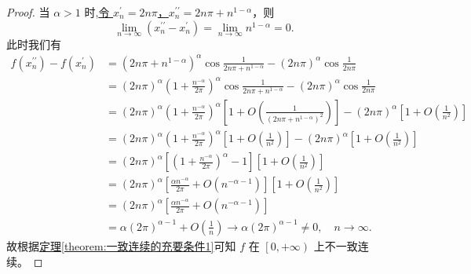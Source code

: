 \documentclass[lang=cn,newtx,10pt,scheme=chinese]{elegantbook}
\begin{document}
\begin{proof}
当 $\alpha > 1$ 时,\hyperlink{找两个数列的方式123}{令 $x_{n}^{\prime} = 2n\pi$，$x_{n}^{\prime\prime} = 2n\pi + n^{1 - \alpha}$}，则
\[
\lim_{n \rightarrow \infty} \left( x_{n}^{\prime\prime} - x_{n}^{\prime} \right) = \lim_{n \rightarrow \infty} n^{1 - \alpha} = 0.
\]
此时我们有
\begin{align*}
f\left( x_{n}^{\prime\prime} \right) - f\left( x_{n}^{\prime} \right) &= \left( 2n\pi + n^{1 - \alpha} \right)^{\alpha} \cos \frac{1}{2n\pi + n^{1 - \alpha}} - \left( 2n\pi \right)^{\alpha} \cos \frac{1}{2n\pi} \\
&= \left( 2n\pi \right)^{\alpha} \left( 1 + \frac{n^{-\alpha}}{2\pi} \right)^{\alpha} \cos \frac{1}{2n\pi + n^{1 - \alpha}} - \left( 2n\pi \right)^{\alpha} \cos \frac{1}{2n\pi} \\
&= \left( 2n\pi \right)^{\alpha} \left( 1 + \frac{n^{-\alpha}}{2\pi} \right)^{\alpha} \left[ 1 + O\left( \frac{1}{\left( 2n\pi + n^{1 - \alpha} \right)^2} \right) \right] - \left( 2n\pi \right)^{\alpha} \left[ 1 + O\left( \frac{1}{n^2} \right) \right] \\
&= \left( 2n\pi \right)^{\alpha} \left( 1 + \frac{n^{-\alpha}}{2\pi} \right)^{\alpha} \left[ 1 + O\left( \frac{1}{n^2} \right) \right] - \left( 2n\pi \right)^{\alpha} \left[ 1 + O\left( \frac{1}{n^2} \right) \right] \\
&= \left( 2n\pi \right)^{\alpha} \left[ \left( 1 + \frac{n^{-\alpha}}{2\pi} \right)^{\alpha} - 1 \right] \left[ 1 + O\left( \frac{1}{n^2} \right) \right] \\
&= \left( 2n\pi \right)^{\alpha} \left[ \frac{\alpha n^{-\alpha}}{2\pi} + O\left( n^{-\alpha - 1} \right) \right] \left[ 1 + O\left( \frac{1}{n^2} \right) \right] \\
&= \left( 2n\pi \right)^{\alpha} \left[ \frac{\alpha n^{-\alpha}}{2\pi} + O\left( n^{-\alpha - 1} \right) \right] \\
&= \alpha \left( 2\pi \right)^{\alpha - 1} + O\left( \frac{1}{n} \right) \rightarrow \alpha \left( 2\pi \right)^{\alpha - 1} \ne 0, \quad n \rightarrow \infty.
\end{align*}
故根据\hyperref[theorem:一致连续的充要条件1]{定理\ref{theorem:一致连续的充要条件1}}可知 $f$ 在 $\left[ 0, +\infty \right)$ 上不一致连续。
\end{proof}
\end{document}
